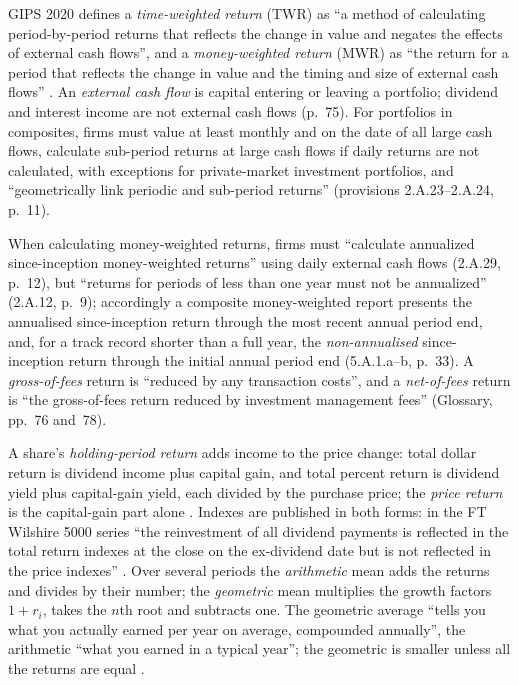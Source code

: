 \begin{qfdefinition}\label{def:return-measures}
 GIPS 2020 defines a \emph{time-weighted return} (TWR) as ``a method of calculating period-by-period returns that reflects the change in value and negates the effects of external cash flows'', and a \emph{money-weighted return} (MWR) as ``the return for a period that reflects the change in value and the timing and size of external cash flows'' \citep[Glossary, pp.~83 and~78]{wide-gips-2020}. An \emph{external cash flow} is capital entering or leaving a portfolio; dividend and interest income are not external cash flows (p.~75). For portfolios in composites, firms must value at least monthly and on the date of all large cash flows, calculate sub-period returns at large cash flows if daily returns are not calculated, with exceptions for private-market investment portfolios, and ``geometrically link periodic and sub-period returns'' (provisions 2.A.23--2.A.24, p.~11).

When calculating money-weighted returns, firms must ``calculate annualized since-inception money-weighted returns'' using daily external cash flows (2.A.29, p.~12), but ``returns for periods of less than one year must not be annualized'' (2.A.12, p.~9); accordingly a composite money-weighted report presents the annualised since-inception return through the most recent annual period end, and, for a track record shorter than a full year, the \emph{non-annualised} since-inception return through the initial annual period end (5.A.1.a--b, p.~33). A \emph{gross-of-fees} return is ``reduced by any transaction costs'', and a \emph{net-of-fees} return is ``the gross-of-fees return reduced by investment management fees'' (Glossary, pp.~76 and~78).

A share's \emph{holding-period return} adds income to the price change: total dollar return is dividend income plus capital gain, and total percent return is dividend yield plus capital-gain yield, each divided by the purchase price; the \emph{price return} is the capital-gain part alone \citep[sec.~15.1]{principles-of-finance-2026}. Indexes are published in both forms: in the FT Wilshire 5000 series ``the reinvestment of all dividend payments is reflected in the total return indexes at the close on the ex-dividend date but is not reflected in the price indexes'' \citep[sec.~1.1, p.~3]{ft-wilshire-5000-2026}. Over several periods the \emph{arithmetic} mean adds the returns and divides by their number; the \emph{geometric} mean multiplies the growth factors $1+r_i$, takes the $n$th root and subtracts one. The geometric average ``tells you what you actually earned per year on average, compounded annually'', the arithmetic ``what you earned in a typical year''; the geometric is smaller unless all the returns are equal \citep[sec.~15.1]{principles-of-finance-2026}.


\end{qfdefinition}
